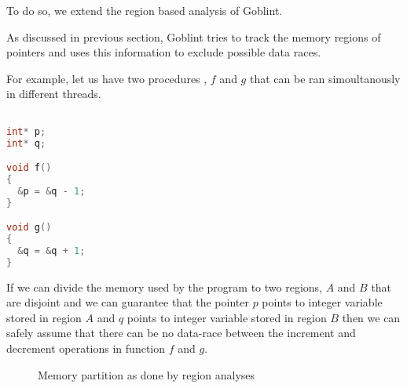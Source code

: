 \documentclass[..thesis.tex]{subfiles}
\begin{document}

To do so, we extend the region based analysis of Goblint.


As discussed in previous section, Goblint tries to track the memory regions of pointers and uses this information to exclude possible data races.


For example, let us have two procedures , $f$ and $g$ that can be ran simoultanously in different threads.

\begin{lstlisting}[language=c,style=def]

int* p;
int* q;

void f()
{
  &p = &q - 1; 
}

void g()
{
  &q = &q + 1; 
}

\end{lstlisting}

 

 If we can divide the memory used by the program to two regions, $A$ and $B$ that are disjoint and we can guarantee that the pointer $p$ points to integer variable stored in region $A$ and $q$ points to integer variable stored in region $B$ then we can safely assume that there can be no data-race between the increment and decrement operations in function $f$ and $g$.

\begin{figure}[H]
  \centering
    \caption{Memory partition as done by region analyses}
\end{figure}
\end{document}
